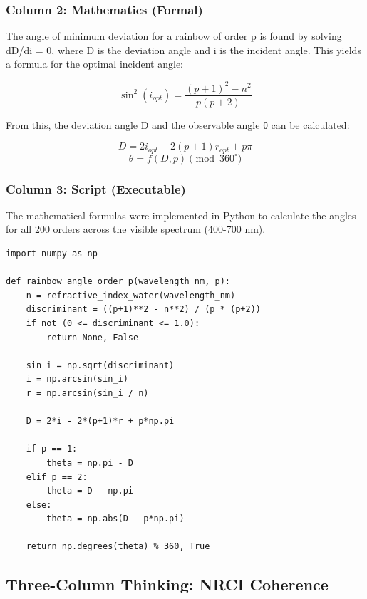 \documentclass[12pt]{article}
\begin{document}
\subsubsection{Column 2: Mathematics (Formal)}
The angle of minimum deviation for a rainbow of order p is found by solving dD/di = 0, where D is the deviation angle and i is the incident angle. This yields a formula for the optimal incident angle:

\begin{equation}
\sin^2(i_{opt}) = \frac{(p+1)^2 - n^2}{p(p+2)}
\end{equation}

From this, the deviation angle D and the observable angle θ can be calculated:

\begin{equation}
D = 2i_{opt} - 2(p+1)r_{opt} + p\pi
\end{equation}
\begin{equation}
\theta = f(D, p) \pmod{360^\circ}
\end{equation}

\subsubsection{Column 3: Script (Executable)}
The mathematical formulas were implemented in Python to calculate the angles for all 200 orders across the visible spectrum (400-700 nm).

\begin{verbatim}
import numpy as np

def rainbow_angle_order_p(wavelength_nm, p):
    n = refractive_index_water(wavelength_nm)
    discriminant = ((p+1)**2 - n**2) / (p * (p+2))
    if not (0 <= discriminant <= 1.0):
        return None, False
    
    sin_i = np.sqrt(discriminant)
    i = np.arcsin(sin_i)
    r = np.arcsin(sin_i / n)
    
    D = 2*i - 2*(p+1)*r + p*np.pi
    
    if p == 1:
        theta = np.pi - D
    elif p == 2:
        theta = D - np.pi
    else:
        theta = np.abs(D - p*np.pi)
        
    return np.degrees(theta) % 360, True
\end{verbatim}

\subsection{Three-Column Thinking: NRCI Coherence}
\end{document}
